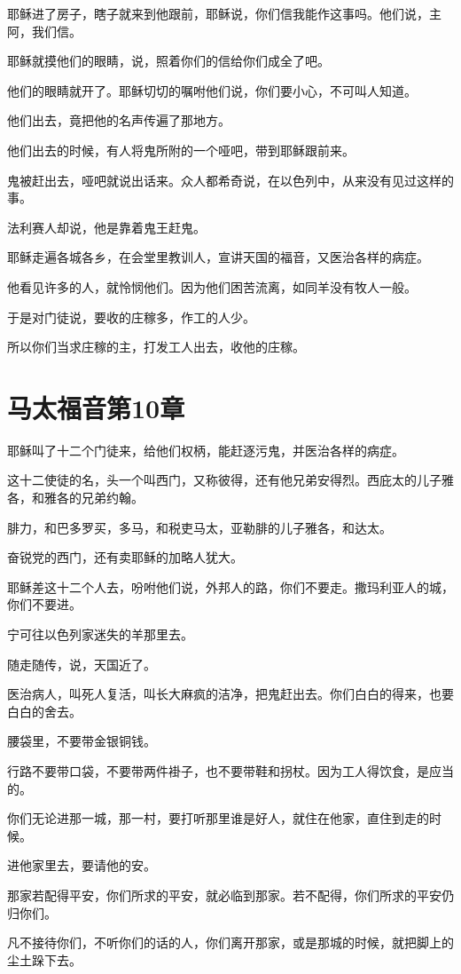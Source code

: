 \documentclass[12pt,oneside]{book}
\begin{document}
耶稣进了房子，瞎子就来到他跟前，耶稣说，你们信我能作这事吗。他们说，主阿，我们信。

耶稣就摸他们的眼睛，说，照着你们的信给你们成全了吧。

他们的眼睛就开了。耶稣切切的嘱咐他们说，你们要小心，不可叫人知道。

他们出去，竟把他的名声传遍了那地方。

他们出去的时候，有人将鬼所附的一个哑吧，带到耶稣跟前来。

鬼被赶出去，哑吧就说出话来。众人都希奇说，在以色列中，从来没有见过这样的事。

法利赛人却说，他是靠着鬼王赶鬼。

耶稣走遍各城各乡，在会堂里教训人，宣讲天国的福音，又医治各样的病症。

他看见许多的人，就怜悯他们。因为他们困苦流离，如同羊没有牧人一般。

于是对门徒说，要收的庄稼多，作工的人少。

所以你们当求庄稼的主，打发工人出去，收他的庄稼。

\chapter{马太福音第10章}
耶稣叫了十二个门徒来，给他们权柄，能赶逐污鬼，并医治各样的病症。

这十二使徒的名，头一个叫西门，又称彼得，还有他兄弟安得烈。西庇太的儿子雅各，和雅各的兄弟约翰。

腓力，和巴多罗买，多马，和税吏马太，亚勒腓的儿子雅各，和达太。

奋锐党的西门，还有卖耶稣的加略人犹大。

耶稣差这十二个人去，吩咐他们说，外邦人的路，你们不要走。撒玛利亚人的城，你们不要进。

宁可往以色列家迷失的羊那里去。

随走随传，说，天国近了。

医治病人，叫死人复活，叫长大麻疯的洁净，把鬼赶出去。你们白白的得来，也要白白的舍去。

腰袋里，不要带金银铜钱。

行路不要带口袋，不要带两件褂子，也不要带鞋和拐杖。因为工人得饮食，是应当的。

你们无论进那一城，那一村，要打听那里谁是好人，就住在他家，直住到走的时候。

进他家里去，要请他的安。

那家若配得平安，你们所求的平安，就必临到那家。若不配得，你们所求的平安仍归你们。

凡不接待你们，不听你们的话的人，你们离开那家，或是那城的时候，就把脚上的尘土跺下去。
\end{document}
